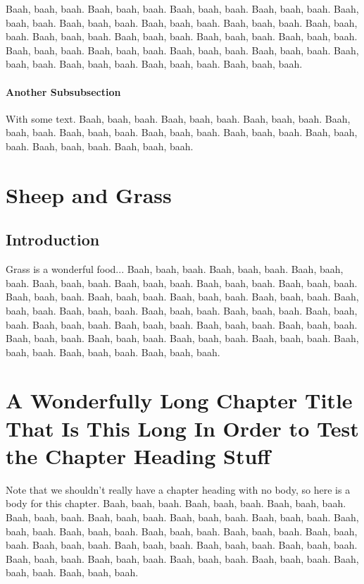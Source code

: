 \documentclass[12pt,honorthesis]{thesis}          %
\begin{document}
Baah, baah, baah.  Baah, baah, baah.  Baah, baah, baah.  Baah, baah,
baah.  Baah, baah, baah.  Baah, baah, baah.  Baah, baah, baah.  Baah,
baah, baah.  Baah, baah, baah.  Baah, baah, baah.  Baah, baah, baah.
Baah, baah, baah.  Baah, baah, baah.  Baah, baah, baah.  Baah, baah,
baah.  Baah, baah, baah.  Baah, baah, baah.  Baah, baah, baah.  Baah,
baah, baah.  Baah, baah, baah.  Baah, baah, baah.
\subsubsection{Another Subsubsection}
With some text.  Baah, baah, baah.  Baah, baah, baah.  Baah, baah,
baah.  Baah, baah, baah.  Baah, baah, baah.  Baah, baah, baah.  Baah,
baah, baah.  Baah, baah, baah.  Baah, baah, baah.  Baah, baah, baah. 

\chapter{Sheep and Grass}

\section{Introduction}

Grass is a wonderful food...  Baah, baah, baah.  Baah, baah, baah.
Baah, baah, baah.  Baah, baah, baah.  Baah, baah, baah.  Baah, baah,
baah.  Baah, baah, baah.  Baah, baah, baah.  Baah, baah, baah.  Baah,
baah, baah.  Baah, baah, baah.  Baah, baah, baah.  Baah, baah, baah.
Baah, baah, baah.  Baah, baah, baah.  Baah, baah, baah.  Baah, baah,
baah.  Baah, baah, baah.  Baah, baah, baah.  Baah, baah, baah.  Baah,
baah, baah.  Baah, baah, baah.  Baah, baah, baah.  Baah, baah, baah.
Baah, baah, baah.  Baah, baah, baah.  Baah, baah, baah. 

\chapter{A Wonderfully Long Chapter Title That Is This Long In Order
  to Test the Chapter Heading Stuff}
Note that we shouldn't really have a chapter heading with no body, so
here is a body for this chapter.  Baah, baah, baah.  Baah, baah, baah.
Baah, baah, baah.  Baah, baah, baah.  Baah, baah, baah.  Baah, baah,
baah.  Baah, baah, baah.  Baah, baah, baah.  Baah, baah, baah.  Baah,
baah, baah.  Baah, baah, baah.  Baah, baah, baah.  Baah, baah, baah.
Baah, baah, baah.  Baah, baah, baah.  Baah, baah, baah.  Baah, baah,
baah.  Baah, baah, baah.  Baah, baah, baah.  Baah, baah, baah.  Baah,
baah, baah.  Baah, baah, baah. 
\end{document}
